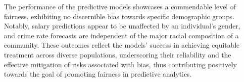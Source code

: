 The performance of the predictive models showcases a commendable level of fairness, exhibiting no discernible bias towards specific demographic groups. Notably, salary predictions appear to be unaffected by an individual's gender, and crime rate forecasts are independent of the major racial composition of a community. These outcomes reflect the models' success in achieving equitable treatment across diverse populations, underscoring their reliability and the effective mitigation of risks associated with bias, thus contributing positively towards the goal of promoting fairness in predictive analytics.